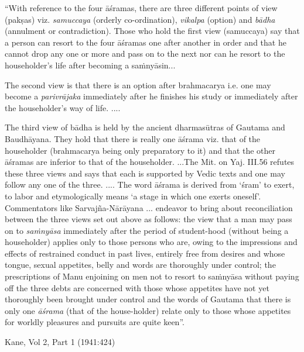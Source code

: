 \begin{myquote}
“With reference to the four āśramas, there are three different points of view (pakṣas) viz. {\sl samuccaya} (orderly co-ordination), {\sl vikalpa} (option) and {\sl bādha} (annulment or contradiction). Those who hold the first view (samuccaya) say that a person can resort to the four āśramas one after another in order and that he cannot drop any one or more and pass on to the next nor can he resort to the householder's life after becoming a saṁnyāsin... 

The second view is that there is an option after brahmacarya i.e. one may become a {\sl parivrājaka} immediately after he finishes his study or immediately after the householder's way of life. ....
 
The third view of bādha is held by the ancient dharmasūtras of Gautama and Baudhāyana. They hold that there is really one āśrama viz. that of the householder (brahmacarya being only preparatory to it) and that the other āśramas are inferior to that of the householder. ...The Mit. on Yaj. III.56 refutes these three views and says that each is supported by Vedic texts and one may follow any one of the three. .... The word āśrama is derived from `śram' to exert, to labor and etymologically means `a stage in which one exerts oneself'.  Commentators like Sarvajña-Nārāyana ... endeavor to bring about reconciliation between the three views set out above as follows: the view that a man may pass on to {\sl saṁnyāsa} immediately after the period of student-hood (without being a householder) applies only to those persons who are, owing to the impressions and effects of restrained conduct in past lives, entirely free from desires and whose tongue, sexual appetites, belly and words are thoroughly under control; the prescriptions of Manu enjoining on men not to resort to saṁnyāsa without paying off the three debts are concerned with those whose appetites have not yet thoroughly been brought under control and the words of Gautama that there is only one {\sl āśrama} (that of the house-holder) relate only to those whose appetites for worldly pleasures and pursuits are quite keen”.

\hfill Kane, Vol 2, Part 1 (1941:424)
\end{myquote}

\newpage

